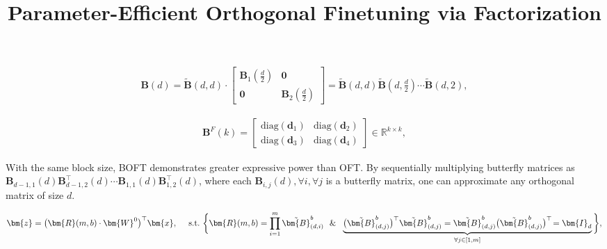 \title{Parameter-Efficient Orthogonal Finetuning via Factorization}
\begin{equation}
\begin{aligned}
    \!\!\bm{B}(d)=\tilde{\bm{B}}(d,d)\!\cdot\!\begin{bmatrix}
    \bm{B}_1(\frac{d}{2})\!\!\!\!\! & \bm{0} \\
    \bm{0}\!\!\!\!\! &\bm{B}_2(\frac{d}{2})
    \end{bmatrix}= \tilde{\bm{B}}(d,d)\tilde{\bm{B}}(d,\frac{d}{2})\cdots\tilde{\bm{B}}(d,2),
\end{aligned}
\end{equation}

\begin{equation}\label{eq:but_factor}
\begin{aligned}
    \bm{B}^F(k)=\begin{bmatrix}
    \text{diag}(\bm{d}_1) & \text{diag}(\bm{d}_2) \\
    \text{diag}(\bm{d}_3) & \text{diag}(\bm{d}_4)
    \end{bmatrix}\in\mathbb{R}^{k\times k},
\end{aligned}
\end{equation}

\begin{theorem}\label{thm:exp_boft}
    With the same block size, BOFT demonstrates greater expressive power than OFT. By sequentially multiplying butterfly matrices as $\bm{B}_{d-1,1}(d)\bm{B}^\top_{d-1,2}(d)\cdots\bm{B}_{1,1}(d)\bm{B}^\top_{1,2}(d)$, where each $\bm{B}_{i,j}(d), \forall i, \forall j$ is a butterfly matrix, one can approximate any orthogonal matrix of size $d$.
\end{theorem}

\begin{equation}
    \begin{aligned}\nonumber
    \bm{z}=\big(\bm{R}(m,b)\cdot\bm{W}^0\big)^\top\bm{x},~~~~\text{s.t.}~\bigg{\{}\bm{R}(m,b)=\prod_{i=1}^m \tilde{\bm{B}}^b_{(d,i)}~~\&~~\underbrace{\big(\tilde{\bm{B}}^b_{(d,j)}\big)^\top\tilde{\bm{B}}^b_{(d,j)}=\tilde{\bm{B}}^b_{(d,j)}\big(\tilde{\bm{B}}^b_{(d,j)}\big)^\top\!=\bm{I}_d}_{\forall j\in [1, m]}\bigg{\}},
    \end{aligned}
\end{equation}

